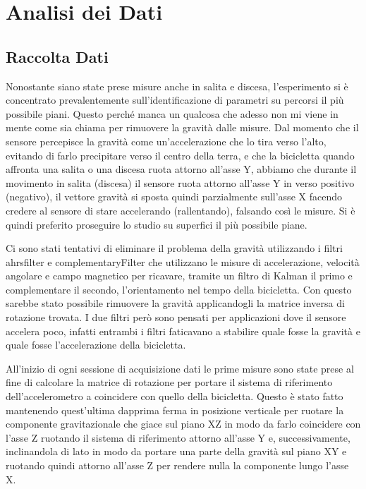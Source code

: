 \documentclass[class=article]{standalone}
\begin{document}
	\section{Analisi dei Dati}
	\subsection{Raccolta Dati}	
	Nonostante siano state prese misure anche in salita e discesa, l'esperimento si è concentrato prevalentemente sull'identificazione di parametri su percorsi il più possibile piani. Questo perché manca un qualcosa che adesso non mi viene in mente come sia chiama per rimuovere la gravità dalle misure. Dal momento che il sensore percepisce la gravità come un'accelerazione che lo tira verso l'alto, evitando di farlo precipitare verso il centro della terra, e che la bicicletta quando affronta una salita o una discesa ruota attorno all'asse Y, abbiamo che durante il movimento in salita (discesa) il sensore ruota attorno all'asse Y in verso positivo (negativo), il vettore gravità si sposta quindi parzialmente sull'asse X facendo credere al sensore di stare accelerando (rallentando), falsando così le misure. Si è quindi preferito proseguire lo studio su superfici il più possibile piane.
	
	Ci sono stati tentativi di eliminare il problema della gravità utilizzando i filtri ahrsfilter e complementaryFilter che utilizzano le misure di accelerazione, velocità angolare e campo magnetico per ricavare, tramite un filtro di Kalman il primo e complementare il secondo, l'orientamento nel tempo della bicicletta. Con questo sarebbe stato possibile rimuovere la gravità applicandogli la matrice inversa di rotazione trovata. I due filtri però sono pensati per applicazioni dove il sensore accelera poco, infatti entrambi i filtri faticavano a stabilire quale fosse la gravità e quale fosse l'accelerazione della bicicletta.
	
	All'inizio di ogni sessione di acquisizione dati le prime misure sono state prese al fine di calcolare la matrice di rotazione per portare il sistema di riferimento dell'accelerometro a coincidere con quello della bicicletta. Questo è stato fatto mantenendo quest'ultima dapprima ferma in posizione verticale per ruotare la componente gravitazionale che giace sul piano XZ in modo da farlo coincidere con l'asse Z ruotando il sistema di riferimento attorno all'asse Y e, successivamente, inclinandola di lato in modo da portare una parte della gravità sul piano XY e ruotando quindi attorno all'asse Z per rendere nulla la componente lungo l'asse X.
	
\end{document}
